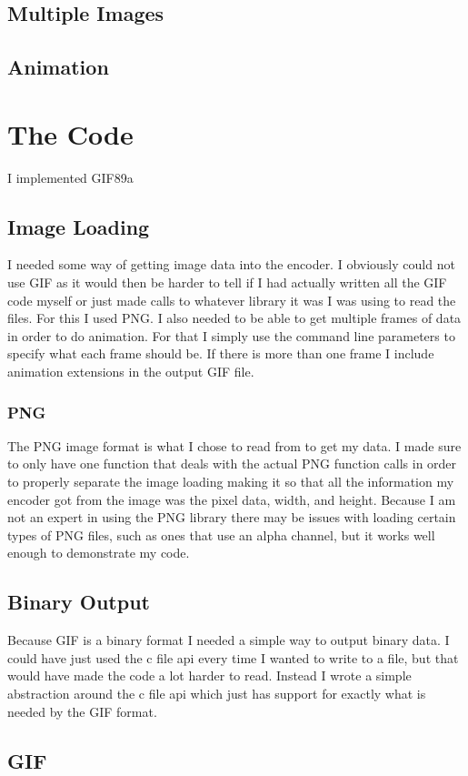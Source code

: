 \documentclass[11pt]{article} %
\begin{document}
\subsection{Multiple Images}

\subsection{Animation}

\section{The Code}
I implemented GIF89a
\subsection{Image Loading}
I needed some way of getting image data into the encoder. I obviously could not use GIF as it would then be harder to tell if I had actually written all the GIF code myself or just made calls to whatever library it was I was using to read the files. For this I used PNG.
I also needed to be able to get multiple frames of data in order to do animation. For that I simply use the command line parameters to specify what each frame should be. If there is more than one frame I include animation extensions in the output GIF file.
\subsubsection{PNG}
The PNG image format is what I chose to read from to get my data. I made sure to only have one function that deals with the actual PNG function calls in order to properly separate the image loading making it so that all the information my encoder got from the image was the pixel data, width, and height. Because I am not an expert in using the PNG library there may be issues with loading certain types of PNG files, such as ones that use an alpha channel, but it works well enough to demonstrate my code.
\subsection{Binary Output}
Because GIF is a binary format I needed a simple way to output binary data. I could have just used the c file api every time I wanted to write to a file, but that would have made the code a lot harder to read. Instead I wrote a simple abstraction around the c file api which just has support for exactly what is needed by the GIF format.
\subsection{GIF}
\end{document}
